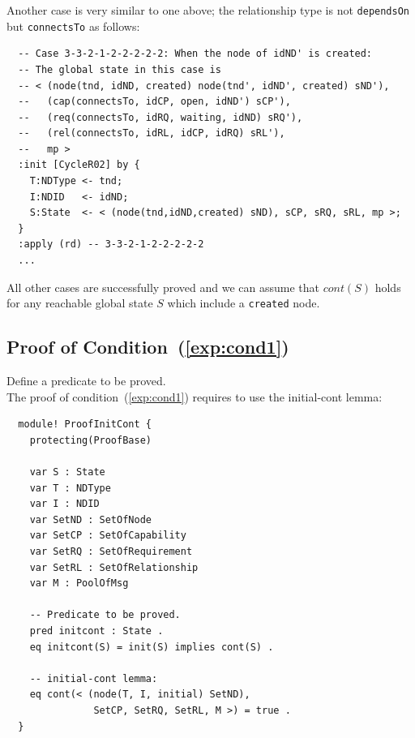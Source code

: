 \documentclass[12pt]{report}
\begin{document}
Another case is very similar to one above; the relationship type
is not {\tt dependsOn} but {\tt connectsTo} as follows:
\small
\begin{verbatim}
  -- Case 3-3-2-1-2-2-2-2-2: When the node of idND' is created:
  -- The global state in this case is
  -- < (node(tnd, idND, created) node(tnd', idND', created) sND'),
  --   (cap(connectsTo, idCP, open, idND') sCP'),
  --   (req(connectsTo, idRQ, waiting, idND) sRQ'),
  --   (rel(connectsTo, idRL, idCP, idRQ) sRL'),
  --   mp >
  :init [CycleR02] by {
    T:NDType <- tnd;
    I:NDID   <- idND;
    S:State  <- < (node(tnd,idND,created) sND), sCP, sRQ, sRL, mp >;
  }
  :apply (rd) -- 3-3-2-1-2-2-2-2-2
  ...
\end{verbatim}
\normalsize

All other cases are successfully proved and we can assume that
$cont(S)$ holds for any reachable global state $S$ which include a
{\tt created} node.

\subsection{Proof of Condition~(\ref{exp:cond1})}
\label{sec:TOSCAinitcont}
 Define a predicate to be proved. \\
The proof of condition~(\ref{exp:cond1}) requires to use the
initial-cont lemma:
\small
\begin{verbatim}
  module! ProofInitCont {
    protecting(ProofBase)

    var S : State
    var T : NDType
    var I : NDID
    var SetND : SetOfNode
    var SetCP : SetOfCapability
    var SetRQ : SetOfRequirement
    var SetRL : SetOfRelationship
    var M : PoolOfMsg

    -- Predicate to be proved.
    pred initcont : State .
    eq initcont(S) = init(S) implies cont(S) .
  
    -- initial-cont lemma: 
    eq cont(< (node(T, I, initial) SetND), 
               SetCP, SetRQ, SetRL, M >) = true .
  }
\end{verbatim}
\normalsize
\end{document}
